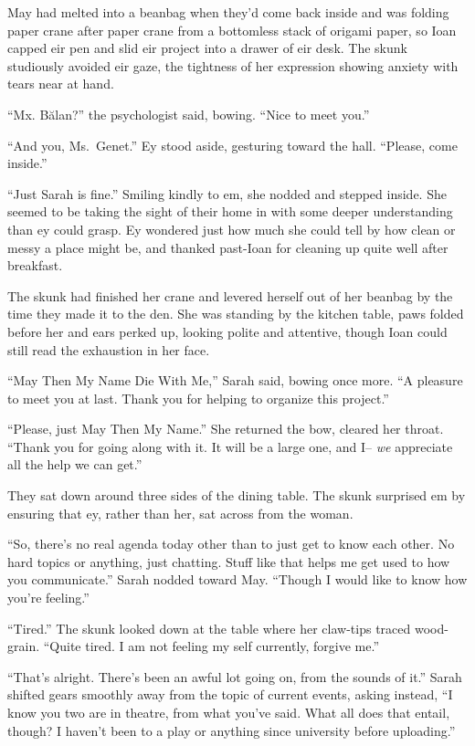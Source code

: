 May had melted into a beanbag when they'd come back inside and was folding paper crane after paper crane from a bottomless stack of origami paper, so Ioan capped eir pen and slid eir project into a drawer of eir desk. The skunk studiously avoided eir gaze, the tightness of her expression showing anxiety with tears near at hand.

``Mx. Bălan?'' the psychologist said, bowing. ``Nice to meet you.''

``And you, Ms.~Genet.'' Ey stood aside, gesturing toward the hall. ``Please, come inside.''

``Just Sarah is fine.'' Smiling kindly to em, she nodded and stepped inside. She seemed to be taking the sight of their home in with some deeper understanding than ey could grasp. Ey wondered just how much she could tell by how clean or messy a place might be, and thanked past-Ioan for cleaning up quite well after breakfast.

The skunk had finished her crane and levered herself out of her beanbag by the time they made it to the den. She was standing by the kitchen table, paws folded before her and ears perked up, looking polite and attentive, though Ioan could still read the exhaustion in her face.

``May Then My Name Die With Me,'' Sarah said, bowing once more. ``A pleasure to meet you at last. Thank you for helping to organize this project.''

``Please, just May Then My Name.'' She returned the bow, cleared her throat. ``Thank you for going along with it. It will be a large one, and I-- \emph{we} appreciate all the help we can get.''

They sat down around three sides of the dining table. The skunk surprised em by ensuring that ey, rather than her, sat across from the woman.

``So, there's no real agenda today other than to just get to know each other. No hard topics or anything, just chatting. Stuff like that helps me get used to how you communicate.'' Sarah nodded toward May. ``Though I would like to know how you're feeling.''

``Tired.'' The skunk looked down at the table where her claw-tips traced wood-grain. ``Quite tired. I am not feeling my self currently, forgive me.''

``That's alright. There's been an awful lot going on, from the sounds of it.'' Sarah shifted gears smoothly away from the topic of current events, asking instead, ``I know you two are in theatre, from what you've said. What all does that entail, though? I haven't been to a play or anything since university before uploading.''

